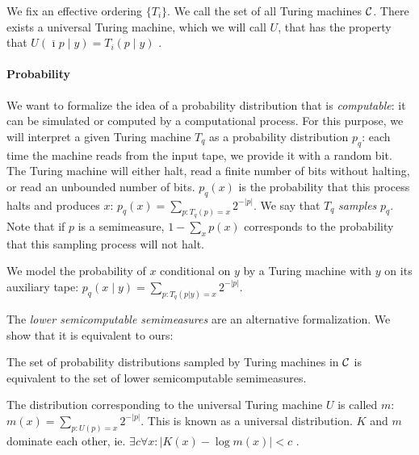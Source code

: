 

We fix an effective ordering $\{T_i\}$. We call the set of all Turing machines ${\cal C}$. There exists a universal Turing machine, which we will call $U$, that has the property that $U(\overline{\imath}p\mid y) = T_i(p\mid y)$ \cite[Theorem~3.1.1]{DBLP:books/daglib/0087328}. 


\paragraph{Probability}

We want to formalize the idea of a probability distribution that is \emph{computable}: it can be simulated or computed by a computational process. For this purpose, we will interpret a given Turing machine $T_q$ as a probability distribution $p_q$: each time the machine reads from the input tape, we provide it with a random bit. The Turing machine will either halt, read a finite number of bits without halting, or read an unbounded number of bits. $p_q(x)$ is the probability that this process halts and produces $x$: $p_q(x) = \sum_{p: T_q(p) = x} 2^{-|p|}$. We say that $T_q$ \emph{samples} $p_q$. Note that if $p$ is a semimeasure, $1-\sum_x p(x)$ corresponds to the probability that this sampling process will not halt.

We model the probability of $x$ conditional on $y$ by a Turing machine with $y$ on its auxiliary tape: $p_q(x \mid y) = \sum_{p : T_q(p|y) = x} 2^{-|p|}$.  

The \emph{lower semicomputable semimeasures} \cite[Chapter~4]{DBLP:books/daglib/0087328} are an alternative formalization. We show that it is equivalent to ours:


\renewcommand*{\thefootnote}{\fnsymbol{footnote}}

\begin{lemma}\footnotemark[2]
The set of probability distributions sampled by Turing machines in ${\cal C}$ is equivalent to the set of lower semicomputable semimeasures.
\label{lemma:sampling-equivalence}
\end{lemma}


\noindent The distribution corresponding to the universal Turing machine $U$ is called $m$: $m(x) = \sum_{p: U(p) = x} 2^{-|p|}$. This is known as a universal distribution. $K$ and $m$ dominate each other, ie. $\exists c \forall x : |K(x) - \log m(x)| < c$ \cite[Theorem~4.3.3]{DBLP:books/daglib/0087328}.

